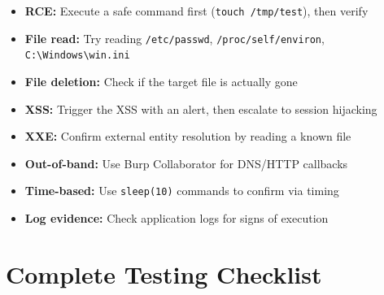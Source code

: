 \documentclass[11pt]{article}
\begin{document}
\begin{checklistbox}
\begin{itemize}
    \item[\checkmark] \textbf{RCE:} Execute a safe command first (\texttt{touch /tmp/test}), then verify
    \item[\checkmark] \textbf{File read:} Try reading \texttt{/etc/passwd}, \texttt{/proc/self/environ}, \texttt{C:\textbackslash Windows\textbackslash win.ini}
    \item[\checkmark] \textbf{File deletion:} Check if the target file is actually gone
    \item[\checkmark] \textbf{XSS:} Trigger the XSS with an alert, then escalate to session hijacking
    \item[\checkmark] \textbf{XXE:} Confirm external entity resolution by reading a known file
    \item[\checkmark] \textbf{Out-of-band:} Use Burp Collaborator for DNS/HTTP callbacks
    \item[\checkmark] \textbf{Time-based:} Use \texttt{sleep(10)} commands to confirm via timing
    \item[\checkmark] \textbf{Log evidence:} Check application logs for signs of execution
\end{itemize}
\end{checklistbox}

\section{Complete Testing Checklist}
\end{document}
